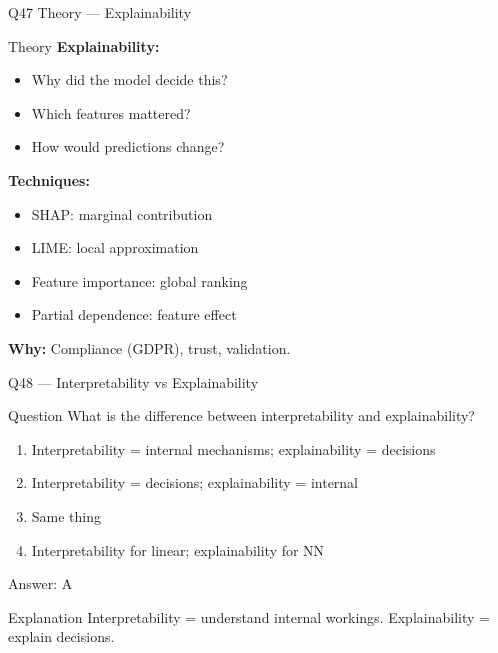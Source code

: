 \documentclass[aspectratio=169,8pt]{beamer}
\begin{document}
	\begin{frame}{Q47 Theory --- Explainability}
		\begin{block}{Theory}
			\textbf{Explainability:}
			\begin{itemize}
				\item Why did the model decide this?
				\item Which features mattered?
				\item How would predictions change?
			\end{itemize}
			\textbf{Techniques:}
			\begin{itemize}
				\item SHAP: marginal contribution
				\item LIME: local approximation
				\item Feature importance: global ranking
				\item Partial dependence: feature effect
			\end{itemize}
			\textbf{Why:} Compliance (GDPR), trust, validation.
		\end{block}
	\end{frame}
	
	\begin{frame}{Q48 --- Interpretability vs Explainability}
		\begin{block}{Question}
			What is the difference between interpretability and explainability?
		\end{block}
		\begin{enumerate}[label=\Alph*.]
			\item Interpretability = internal mechanisms; explainability = decisions
			\item Interpretability = decisions; explainability = internal
			\item Same thing
			\item Interpretability for linear; explainability for NN
		\end{enumerate}
		\begin{exampleblock}{Answer: A}
		\end{exampleblock}
		\begin{block}{Explanation}
			Interpretability = understand internal workings. Explainability = explain decisions.
		\end{block}
	\end{frame}
	
\end{document}
